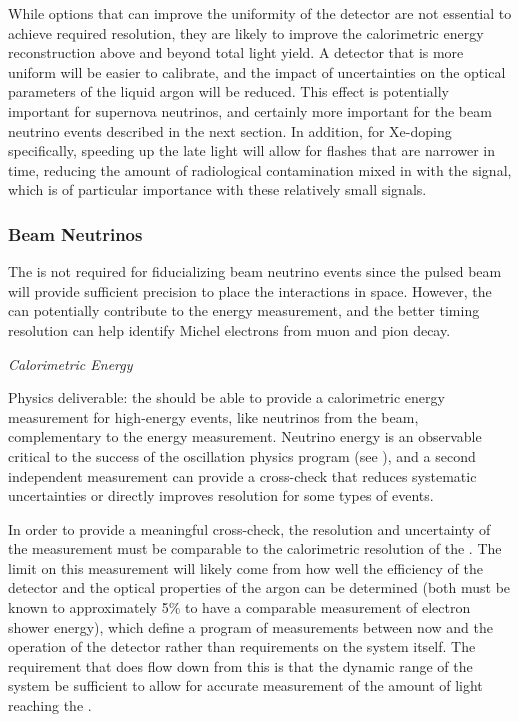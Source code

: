 While options that can improve the uniformity of the detector are not essential to achieve required resolution, they are likely to improve the calorimetric energy reconstruction above and beyond total light yield. A detector that is more uniform will be easier to calibrate, and the impact of uncertainties on the optical parameters of the liquid argon will be reduced. This effect is potentially important for supernova neutrinos, and certainly more important for the beam neutrino events described in the next section. In addition, for Xe-doping specifically, speeding up the late light will allow for flashes that are narrower in time, reducing the amount of radiological contamination mixed in with the signal, which is of particular importance with these relatively small signals.


\subsubsection{Beam Neutrinos}
\label{subsec:fdsp-pd-simphys-beam}

The  is not required for fiducializing beam neutrino events since the pulsed beam will provide sufficient precision to place the interactions in space. However, the  can potentially contribute to the energy measurement, and the better timing resolution can help identify Michel electrons from muon and pion decay.


\textit{Calorimetric Energy}\nopagebreak

Physics deliverable: the  should be able to provide a calorimetric energy measurement for high-energy events, like neutrinos from the  beam, complementary to the  energy measurement.
Neutrino energy is an observable critical to the success of the oscillation physics program (see \physchlbl{}),
and a second independent measurement can provide a cross-check that reduces systematic uncertainties or directly improves resolution for some types of events. 

In order to provide a meaningful cross-check, the resolution and uncertainty of the  measurement must be comparable to the calorimetric resolution of the . The limit on this measurement will likely come from how well the efficiency of the detector and the optical properties of the argon can be determined (both must be known to approximately 5\% to have a comparable measurement of electron shower energy), which define a program of measurements between now and the operation of the detector rather than requirements on the system itself. The requirement that does flow down from this is that the dynamic range of the system be sufficient to allow for accurate measurement of the amount of light reaching the . 

